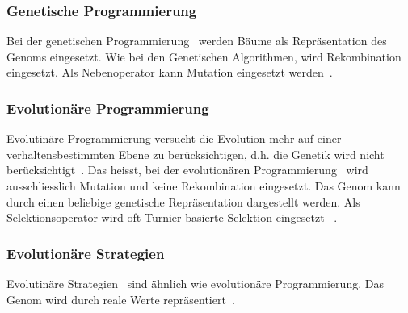     \subsubsection{Genetische Programmierung\label{item:genProg}}

      Bei der genetischen Programmierung~\cite{book:genProg} werden Bäume als Repräsentation des Genoms eingesetzt. Wie bei den Genetischen Algorithmen,
      wird Rekombination eingesetzt. Als Nebenoperator kann Mutation eingesetzt werden~\cite[S.147]{book:evAlgo}.

    \subsubsection{Evolutionäre Programmierung\label{item:evProg}}

      Evolutinäre Programmierung versucht die Evolution mehr auf einer verhaltensbestimmten Ebene zu berücksichtigen, d.h. die Genetik wird nicht berücksichtigt~\cite[S.140]{book:evAlgo}.
      Das heisst, bei der evolutionären Programmierung~\cite{book:artIntSimEv} wird ausschliesslich Mutation und keine Rekombination eingesetzt.
      Das Genom kann durch einen beliebige genetische Repräsentation dargestellt werden. Als Selektionsoperator wird oft Turnier-basierte Selektion eingesetzt ~\cite[S.33]{book:bioInspired}.

    \subsubsection{Evolutionäre Strategien\label{item:evStrat}}

      Evolutinäre Strategien~\cite{book:evStrat} sind ähnlich wie evolutionäre Programmierung.
      Das Genom wird durch reale Werte repräsentiert~\cite[S.134]{book:evAlgo}.
